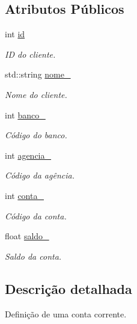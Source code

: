 \subsection*{Atributos Públicos}
\begin{DoxyCompactItemize}
\item 
int \hyperlink{structApp_1_1Account_a35f4493e178e305213a9950b776cac3b}{id}
\begin{DoxyCompactList}\small\item\em ID do cliente. \end{DoxyCompactList}\item 
std\+::string \hyperlink{structApp_1_1Account_aa636b3b67fe15ab752ef087d42a6fe84}{nome\+\_\+}
\begin{DoxyCompactList}\small\item\em Nome do cliente. \end{DoxyCompactList}\item 
int \hyperlink{structApp_1_1Account_ac07004b5b5712a68cd07462dc598389b}{banco\+\_\+}
\begin{DoxyCompactList}\small\item\em Código do banco. \end{DoxyCompactList}\item 
int \hyperlink{structApp_1_1Account_a622445e22f5394daa48d147db3bf8b91}{agencia\+\_\+}
\begin{DoxyCompactList}\small\item\em Código da agência. \end{DoxyCompactList}\item 
int \hyperlink{structApp_1_1Account_a52e9d19a6558efb365fd21c486ae0d73}{conta\+\_\+}
\begin{DoxyCompactList}\small\item\em Código da conta. \end{DoxyCompactList}\item 
float \hyperlink{structApp_1_1Account_a985daa05cb4ae4146b7c356852f4517d}{saldo\+\_\+}
\begin{DoxyCompactList}\small\item\em Saldo da conta. \end{DoxyCompactList}\end{DoxyCompactItemize}


\subsection{Descrição detalhada}
Definição de uma conta corrente. 


